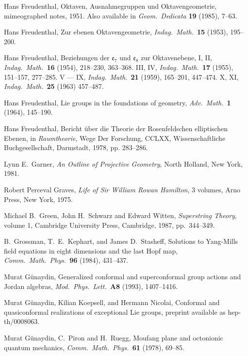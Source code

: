 \documentclass[12pt]{article}
\newcommand{\e}{{\mathfrak {e}}}
\begin{document}
\begin{thebibliography}{10}
  Hans Freudenthal, Oktaven, Ausnahmegruppen und    
Oktavengeometrie, mimeographed notes, 1951.  Also available in
{\sl Geom.\ Dedicata} {\bf 19} (1985), 7--63.    
   
 Hans Freudenthal, Zur ebenen Oktavengeometrie,    
{\sl Indag.\ Math.\ }{\bf 15} (1953), 195--200.   
   
 Hans Freudenthal, Beziehungen der $\e_7$ und   
$\e_8$ zur Oktavenebene, I, II, {\sl Indag.\ Math.\ }{\bf 16} (1954),   
218--230, 363--368.  III, IV, {\sl Indag.\ Math.\ }{\bf 17} (1955),   
151--157, 277--285.  V --- IX, {\sl Indag.\ Math.\ }{\bf 21} (1959),  
165--201, 447--474.  X, XI, {\sl Indag.\ Math.\ }{\bf 25} (1963) 457--487. 
   
 Hans Freudenthal, Lie groups in the foundations of   
geometry, {\sl Adv.\ Math.\ }{\bf 1} (1964), 145--190.   

 Hans Freudenthal, Bericht \"uber die Theorie   
der Rosenfeldschen elliptischen Ebenen, in {\sl Raumtheorie}, Wege  
Der Forschung, CCLXX, Wissenschaftliche Buchgesellschaft, Darmstadt,  
1978, pp. 283--286.  

 Lynn E.\ Garner, {\sl An Outline of Projective Geometry}, 
North Holland, New York, 1981. 
   
 Robert Perceval Graves, {\sl Life of Sir William Rowan   
Hamilton}, 3 volumes, Arno Press, New York, 1975.   
   
 Michael B.\ Green, John H.\ Schwarz and Edward Witten,   
{\sl Superstring Theory}, volume 1, Cambridge University Press,    
Cambridge, 1987, pp.\ 344--349.   
 
 B.\ Grossman, T.\ E.\ Kephart, and James D.\ Stasheff, 
Solutions to Yang-Mills field equations in eight dimensions and the  
last Hopf map, {\sl Comm.\ Math.\ Phys.\ }{\bf 96} (1984), 431--437. 

 Murat G\"unaydin, Generalized conformal and
superconformal group actions and Jordan algebras, 
{\sl Mod.\ Phys.\ Lett.\ }{\bf A8} (1993), 1407--1416.

 Murat G\"unaydin, Kilian Koepsell, and Hermann Nicolai, 
Conformal and quasiconformal realizations of exceptional Lie groups,
preprint available as hep-th/0008063.

 Murat G\"unaydin, C.\ Piron and H.\ Ruegg, Moufang plane
and octonionic quantum mechanics, {\sl Comm.\ Math.\ Phys.\ }{\bf 61}
(1978), 69--85.
  

\end{thebibliography}
\end{document}
